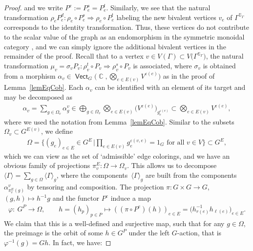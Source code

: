 \documentclass[10pt,a4paper]{amsart}
\DeclareMathOperator{\vect}{\mathsf{Vect}}
\DeclareMathOperator{\C}{\mathbb{C}}
\newcommand{\sslash}{\mathbin{/\mkern-6mu/}}
\numberwithin{equation}{section}
\theoremstyle{definition}
\begin{document}
\begin{proof}
and we write $P^e := P_e^s = P_e^t$. Similarly, we see that the natural transformation $\rho_e P_e^d\colon \rho_e \circ P_e^s \Rightarrow \rho_e \circ P_e^t$ labeling the new bivalent vertices $v_e$ of $\Gamma^{\mathbb{S}_{\Gamma}}$ corresponds to the identity transformation. Thus, these vertices do not contribute to the scalar value of the graph as an endomorphism in the symmetric monoidal category \smash{$\vect_{\C}^{G^P\sslash G}$}, and we can simply ignore the additional bivalent vertices in the remainder of the proof. Recall that to a vertex $v \in V(\Gamma) \subset V\bigl(\Gamma^{\mathbb{S}_{\Gamma}}\bigr)$, the natural transformation $\mu_v =\sigma_v P_v\colon \rho_v^t \circ P_v \Rightarrow \rho_v^s \circ P_v$ is associated, where $\sigma_v$ is obtained from a morphism $\alpha_v \in \vect_G\bigl(\C, \bigotimes_{e \in E(v)}V^{\varepsilon(e)}\bigr)$ as in the proof of Lemma~\ref{lemEqCob}.
Each $\alpha_v$ can be identified with an element of its target and may be decomposed as
\begin{align*}
 \alpha_v = \sum_{g \in \Omega_v} \alpha_g^v \in \bigoplus_{g \in \Omega_v} \bigotimes_{e \in E(v)}\bigl(V^{\varepsilon(e)}\bigr)_{g_e^{\varepsilon(e)}} \subset \bigotimes_{e \in E(v)}V^{\varepsilon(e)},
\end{align*}
where we used the notation from Lemma~\ref{lemEqCob}. Similar to the subsets $\Omega_v \subset G^{E(v)}$, we define
\begin{align*}
 \Omega = \biggl\{(g_e)_{e \in E} \in G^E \, \bigg| \prod_{e \in E(v)} g_e^{ \varepsilon(v, e)} = 1_G \text{ for all } v \in V\biggr\} \subset G^E,
\end{align*}
which we can view as the set of `admissible' edge colorings, and we have an obvious family of projections $\pi_v^E\colon \Omega \rightarrow \Omega_v$. This allows us to decompose $\langle \Gamma \rangle = \sum_{g \in \Omega}\langle \Gamma \rangle_g$, where the components~$\langle \Gamma \rangle_g$ are built from the components~$\alpha_{\pi_v^E(g)}^v$ by tensoring and composition. The projection $\pi\colon G \times G \rightarrow G$, $(g,h) \mapsto h^{-1}g$ and the functor $P^e$ induce a map
\begin{align*}
 \varphi\colon \ G^P \rightarrow \Omega, \qquad h = (h_p)_{p \in P} \mapsto ((\pi \circ P^e)(h) )_{e \in E} = \bigl(h_{r(e)}^{-1}h_{\ell(e)}\bigr)_{e \in E}.
\end{align*}
We claim that this is a well-defined and surjective map, such that for any $g \in \Omega$, the preimage is the orbit of some $h \in G^P$ under the left $G$-action, that is $\varphi^{-1}(g) = Gh$. In fact, we have:

\end{proof}
\end{document}

